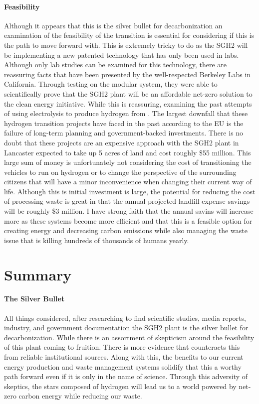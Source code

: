 \documentclass[3p,sort]{elsarticle}
\begin{document}
\paragraph{Feasibility} Although it appears that this is the silver bullet for decarbonization an 
examination of the feasibility of the transition is essential for considering if this is the path 
to move forward with. This is extremely tricky to do as the SGH2 will be implementing a new 
patented technology that has only been used in labs. 
Although only lab studies can be examined for this technology, there are reassuring facts 
that have been presented by the well-respected Berkeley Labs in California.
Through testing on the modular system, they were able to scientifically prove that the SGH2 
plant will be an affordable net-zero solution to the clean energy initiative. While this is 
reassuring, examining the past attempts of using electrolysis to produce hydrogen from . 
The largest downfall that these hydrogen transition projects have faced in the past according to 
the EU is the failure of long-term planning and government-backed investments. There is no doubt 
that these projects are an expensive approach with the SGH2 plant in Lancaster expected to take up 
5 acres of land and cost roughly \$55 million. This large sum of money is unfortunately not 
considering the cost of transitioning the vehicles to run on hydrogen or to change the perspective 
of the surrounding citizens that will have a minor inconvenience when changing their current way of 
life. Although this is initial investment is large, the potential for reducing the cost of processing 
waste is great in that the annual projected landfill expense savings will be roughly \$3 million. 
I have strong faith 
that the annual savins will increase more as these systems become more efficient and that this is a 
feasible option for creating energy and
decreasing carbon emissions while also managing the waste issue that is killing hundreds of 
thousands of humans yearly.

\cite{berkeley,sgh2site, bloomberg}


\section{Summary}
\paragraph{The Silver Bullet} All things considered, after researching to find scientific studies, 
media reports, industry, and government documentation the SGH2 plant is the silver bullet for 
decarbonization. While there is an assortment of skepticism around the feasibility of this plant 
coming to fruition. There is more evidence that counteracts this from reliable institutional sources. 
Along with this, the benefits to our current energy production and waste management systems solidify 
that this a worthy path forward even if it is only in the name of science. Through this adversity of 
skeptics, the stars composed of hydrogen will lead us to a world powered by 
net-zero carbon energy while reducing our waste.
  


\newpage

\end{document}
